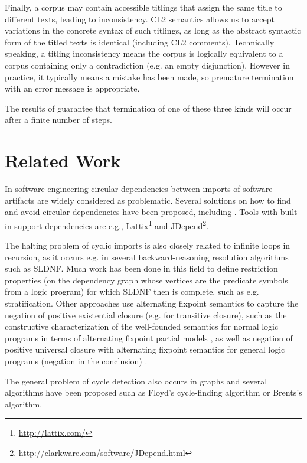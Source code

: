 \documentclass{IOS-Book-Article}
\begin{document}
{%
Finally, a corpus may contain accessible titlings that assign the same title to different texts, leading to inconsistency.
CL2 semantics allows us to accept variations in the concrete syntax of such titlings, as long as the abstract syntactic form
of the titled texts is identical (including CL2 comments).
Technically speaking, a titling inconsistency means the corpus is logically equivalent to a corpus containing only a contradiction (e.g. an empty disjunction).
However in practice, it typically means a mistake has been made, so premature termination with an error message is appropriate.

The results of \cite{Athan2013} guarantee that termination of one of these three kinds will occur after a finite number of steps. 
}

\section{Related Work}
\label{related}

In software engineering circular dependencies between imports of software artifacts are widely considered as problematic. Several solutions on how to find and avoid circular dependencies have been proposed, including \cite{Laval:2009, Sangal:2005, Melton:2007, Vainsencher:2004}. Tools with built-in support dependencies are e.g., Lattix\footnote{\url{http://lattix.com/}} and JDepend\footnote{\url{http://clarkware.com/software/JDepend.html}}.

The halting problem of cyclic imports is also closely related to infinite loops in recursion, as it occurs e.g. in several backward-reasoning resolution algorithms such as SLDNF. Much work has been done in this field to define restriction properties (on the dependency graph whose vertices are the predicate symbols from a logic program) for which SLDNF then is complete, such as e.g. stratification. Other approaches use alternating fixpoint semantics to capture the negation of positive existential closure (e.g. for transitive closure), such as the constructive characterization of the well-founded semantics for normal logic programs in terms of alternating fixpoint partial models \cite{VanGelder:1989}, as well as negation of positive universal closure with alternating fixpoint semantics for general logic programs (negation in the conclusion) \cite{VanGelder:1991}.

The general problem of cycle detection also occurs in graphs and several algorithms have been proposed such as Floyd's cycle-finding algorithm or Brents's algorithm.
\end{document}
